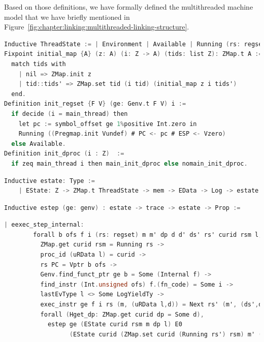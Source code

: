 Based on those definitions, we have formally defined 
the multithreaded machine model that we have briefly 
mentioned in Figure~\ref{fig:chapter:linking:multithreaded-linking-structure}.
\begin{lstlisting}[language=C]
Inductive ThreadState := | Environment | Available | Running (rs: regset).
Fixpoint initial_map {A} (z: A) (i: Z -> A) (tids: list Z): ZMap.t A :=
  match tids with
    | nil => ZMap.init z
    | tid::tids' => ZMap.set tid (i tid) (initial_map z i tids')
  end.
Definition init_regset {F V} (ge: Genv.t F V) i :=
  if decide (i = main_thread) then
    let pc := symbol_offset ge 1%positive Int.zero in
    Running ((Pregmap.init Vundef) # PC <- pc # ESP <- Vzero)
  else Available.
Definition init_dproc (i : Z)  :=
  if zeq main_thread i then main_init_dproc else nomain_init_dproc.
\end{lstlisting}



\begin{lstlisting}[language=C]
  Inductive estate: Type :=
    | EState: Z -> ZMap.t ThreadState -> mem -> EData -> Log -> estate.
\end{lstlisting}


\begin{lstlisting}[language=C]
  Inductive estep (ge: genv) : estate -> trace -> estate -> Prop :=
\end{lstlisting}


\begin{lstlisting}[language=C]
    | eexec_step_internal:
        forall b ofs f i (rs: regset) m m' dp d d' ds' rs' curid rsm l,
          ZMap.get curid rsm = Running rs ->
          proc_id (uRData l) = curid ->
          rs PC = Vptr b ofs ->
          Genv.find_funct_ptr ge b = Some (Internal f) ->
          find_instr (Int.unsigned ofs) f.(fn_code) = Some i ->
          lastEvType l <> Some LogYieldTy ->
          exec_instr ge f i rs (m, (uRData l,d)) = Next rs' (m', (ds',d')) ->
          forall (Hget_dp: ZMap.get curid dp = Some d),
            estep ge (EState curid rsm m dp l) E0
                  (EState curid (ZMap.set curid (Running rs') rsm) m' (ZMap.set curid (Some d') dp) l)
\end{lstlisting}



